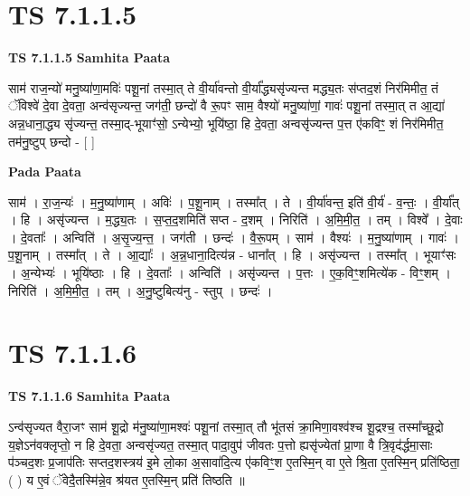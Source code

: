 \documentclass[17pt]{extarticle}
\begin{document}
\section*{ TS 7.1.1.5 }

\textbf{TS 7.1.1.5 } \newline
\textbf{Samhita Paata} \newline

साम॑ राज॒न्यो॑ मनु॒ष्या॑णा॒मविः॑ पशू॒नां तस्मा॒त् ते वी॒र्या॑वन्तो वी॒र्या᳚द्ध्यसृ॑ज्यन्त मद्ध्य॒तः स॑प्तद॒शं निर॑मिमीत॒ तं ॅविश्वे॑ दे॒वा दे॒वता॒ अन्व॑सृज्यन्त॒ जग॑ती॒ छन्दो॑ वै रू॒पꣳ साम॒ वैश्यो॑ मनु॒ष्या॑णां॒ गावः॑ पशू॒नां तस्मा॒त् त आ॒द्या॑ अन्न॒धाना॒द्ध्य सृ॑ज्यन्त॒ तस्मा॒द्-भूयाꣳ॑सो॒ ऽन्येभ्यो॒ भूयि॑ष्ठा॒ हि दे॒वता॒ अन्वसृ॑ज्यन्त प॒त्त ए॑कविꣳ॒॒ शं निर॑मिमीत॒ तम॑नु॒ष्टुप् छन्दो - [  ] \newline

\textbf{Pada Paata} \newline

साम॑ । रा॒ज॒न्यः॑ । म॒नु॒ष्या॑णाम् । अविः॑ । प॒शू॒नाम् । तस्मा᳚त् । ते । वी॒र्या॑वन्त॒ इति॑ वी॒र्य॑ - व॒न्तः॒ । वी॒र्या᳚त् । हि । असृ॑ज्यन्त । म॒द्ध्य॒तः । स॒प्त॒द॒शमिति॑ सप्त - द॒शम् । निरिति॑ । अ॒मि॒मी॒त॒ । तम् । विश्वे᳚ । दे॒वाः । दे॒वताः᳚ । अन्विति॑ । अ॒सृ॒ज्य॒न्त॒ । जग॑ती । छन्दः॑ । वै॒रू॒पम् । साम॑ । वैश्यः॑ । म॒नु॒ष्या॑णाम् । गावः॑ । प॒शू॒नाम् । तस्मा᳚त् । ते । आ॒द्याः᳚ । अ॒न्न॒धाना॒दित्य॑न्न - धाना᳚त् । हि । असृ॑ज्यन्त । तस्मा᳚त् । भूयाꣳ॑सः । अ॒न्येभ्यः॑ । भूयि॑ष्ठाः । हि । दे॒वताः᳚ । अन्विति॑ । असृ॑ज्यन्त । प॒त्तः । ए॒क॒विꣳ॒॒शमित्ये॑क - विꣳ॒॒शम् । निरिति॑ । अ॒मि॒मी॒त॒ । तम् । अ॒नु॒ष्टुबित्य॑नु - स्तुप् । छन्दः॑ ।  \newline




\section*{ TS 7.1.1.6 }

\textbf{TS 7.1.1.6 } \newline
\textbf{Samhita Paata} \newline

ऽन्व॑सृज्यत वैरा॒जꣳ साम॑ शू॒द्रो म॑नु॒ष्या॑णा॒मश्वः॑ पशू॒नां तस्मा॒त् तौ भू॑तसं क्रा॒मिणा॒वश्व॑श्च शू॒द्रश्च॒ तस्मा᳚च्छू॒द्रो य॒ज्ञेऽन॑वक्लृप्तो॒ न हि दे॒वता॒ अन्वसृ॑ज्यत॒ तस्मा॒त् पादा॒वुप॑ जीवतः प॒त्तो ह्यसृ॑ज्येतां प्रा॒णा वै त्रि॒वृद॑र्द्धमा॒साः प॑ञ्चद॒शः प्र॒जाप॑तिः सप्तद॒शस्त्रय॑ इ॒मे लो॒का अ॒सावा॑दि॒त्य ए॑कविꣳ॒॒श ए॒तस्मि॒न् वा ए॒ते श्रि॒ता ए॒तस्मि॒न् प्रति॑ष्ठिता॒ ( ) य ए॒वं ॅवेदै॒तस्मि॑न्ने॒व श्र॑यत ए॒तस्मि॒न् प्रति॑ तिष्ठति ॥ \newline
\end{document}
